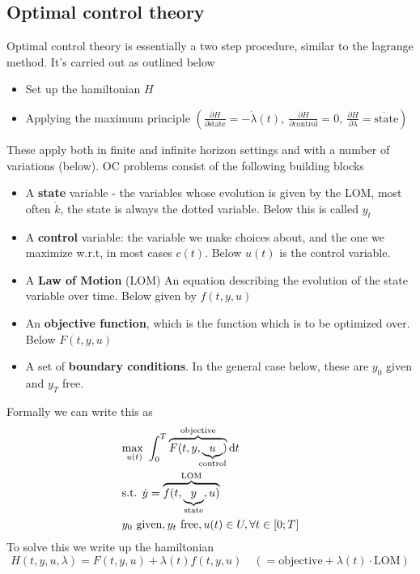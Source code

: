 \documentclass[12pt, a4paper]{article}
\begin{document}
\begin{spacing}{1.213}
\section{Optimal control theory}
Optimal control theory is essentially a two step procedure, similar to the lagrange method. It's carried out as outlined below
\begin{itemize}
\item Set up the hamiltonian $H$
\item Applying the maximum principle $\left( \frac{\partial H}{\partial \textrm{state}} = -\dot{\lambda}(t), \ \frac{\partial H}{\partial \textrm{control}} = 0, \ \frac{\partial H}{\partial \lambda} = \dot{\textrm{state}} \right) $
\end{itemize}
These apply both in finite and infinite horizon settings and with a number of variations (below). OC problems consist of the following building blocks
\begin{itemize}
\item A \textbf{state} variable - the variables whose evolution is given by the LOM, most often $\dot{k}$, the state is always the dotted variable. Below this is called $y_t$
\item A \textbf{control} variable: the variable we make choices about, and the one we maximize w.r.t, in most cases $c(t)$. Below $u(t)$ is the control variable. 
\item A \textbf{Law of Motion} (LOM) An equation describing the evolution of the state variable over time. Below given by $f(t,y,u)$
\item An \textbf{objective function}, which is the function which is to be optimized over. Below $F(t,y,u)$
\item A set of \textbf{boundary conditions}. In the general case below, these are $y_0$ given and $y_T$ free.
\end{itemize}
Formally we can write this as 
\begin{align*}
&\underset{u(t)}{\textrm{max }} \int_0^{T} \overbrace{F(t,y,\underbrace{u}_{\mathclap{\textrm{control}}})}^{\textrm{objective}} \textrm{d}t \\
& \textrm{s.t. } \dot{y} = \overbrace{f(t,\underbrace{y}_{\mathclap{\textrm{state}}},u)}^{\textrm{LOM}} \\ 
&y_0 \textrm{ given}, y_t \textrm{ free}, u(t) \in U, \forall t \in [0;T]
\end{align*}
To solve this we write up the hamiltonian 
\begin{equation}
H(t,y,u,\lambda) = F(t,y,u) + \lambda(t) f(t,y,u) \quad (= \textrm{objective} + \lambda(t) \cdot \textrm{LOM})

\end{equation}
\end{spacing}
\end{document}
